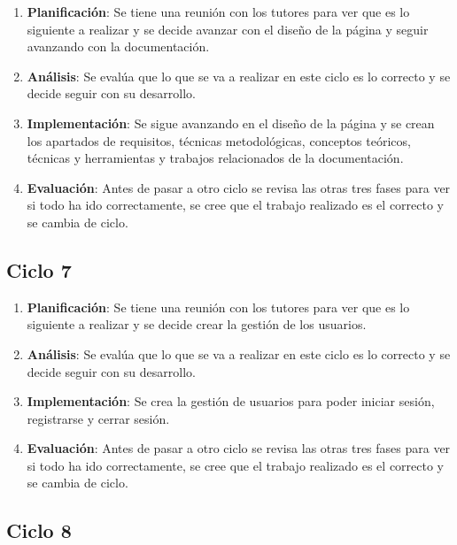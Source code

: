 \begin{enumerate}
	\item \textbf{Planificación}: Se tiene una reunión con los tutores para ver que es lo siguiente a realizar y se decide avanzar con el diseño de la página y seguir avanzando con la documentación.
	\item \textbf{Análisis}: Se evalúa que lo que se va a realizar en este ciclo es lo correcto y se decide seguir con su desarrollo.
	\item \textbf{Implementación}: Se sigue avanzando en el diseño de la página y se crean los apartados de requisitos, técnicas metodológicas, conceptos teóricos, técnicas y herramientas y trabajos relacionados de la documentación.
	\item \textbf{Evaluación}: Antes de pasar a otro ciclo se revisa las otras tres fases para ver si todo ha ido correctamente, se cree que el trabajo realizado es el correcto y se cambia de ciclo.
\end{enumerate}

\subsection{Ciclo 7}

\begin{enumerate}
	\item \textbf{Planificación}: Se tiene una reunión con los tutores para ver que es lo siguiente a realizar y se decide crear la gestión de los usuarios.
	\item \textbf{Análisis}: Se evalúa que lo que se va a realizar en este ciclo es lo correcto y se decide seguir con su desarrollo.
	\item \textbf{Implementación}: Se crea la gestión de usuarios para poder iniciar sesión, registrarse y cerrar sesión.
	\item \textbf{Evaluación}: Antes de pasar a otro ciclo se revisa las otras tres fases para ver si todo ha ido correctamente, se cree que el trabajo realizado es el correcto y se cambia de ciclo.
\end{enumerate}

\subsection{Ciclo 8}

